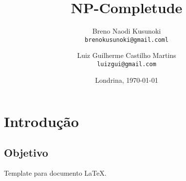 \documentclass[12pt,a4papper]{article}
\title{NP-Completude}
\author{Breno Naodi Kusunoki \\
        \texttt{brenokusunoki@gmail.coml}
        \and 
        Luiz Guilherme Castilho Martins \\
        \texttt{luizgui@gmail.com}
}
\date{Londrina, \today}
\begin{document}
\maketitle
\thispagestyle{empty}
\newpage

\tableofcontents
\thispagestyle{empty}
\newpage

  \section{Introdução}

  \subsection{Objetivo}
  Template para documento \LaTeX.
\end{document}
